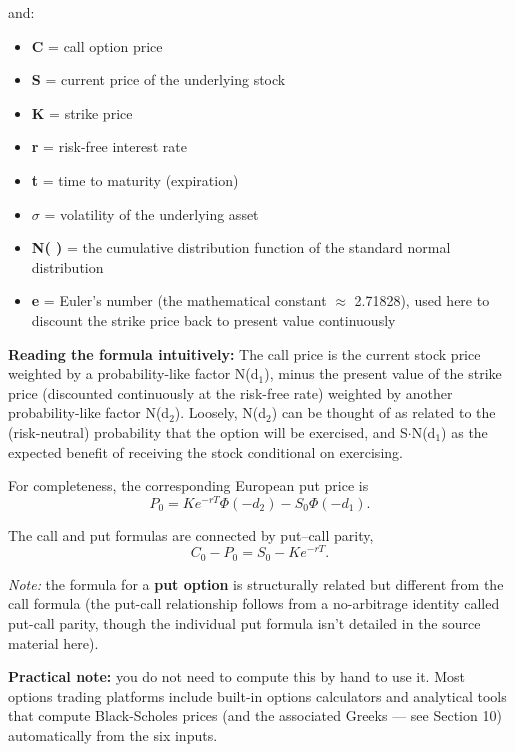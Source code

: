 \documentclass[12pt,openany]{book}
\theoremstyle{definition}
\theoremstyle{remark}
\begin{document}
and:

\begin{itemize}
\item \textbf{C} = call option price


\item \textbf{S} = current price of the underlying stock


\item \textbf{K} = strike price


\item \textbf{r} = risk-free interest rate


\item \textbf{t} = time to maturity (expiration)


\item \textbf{\(\sigma\)} = volatility of the underlying asset


\item \textbf{N( )} = the cumulative distribution function of the standard normal distribution


\item \textbf{e} = Euler's number (the mathematical constant \(\approx\) 2.71828), used here to discount the strike price back to present value continuously


\end{itemize}

\textbf{Reading the formula intuitively:} The call price is the current stock price weighted by a probability-like factor N(d\(_1\)), minus the present value of the strike price (discounted continuously at the risk-free rate) weighted by another probability-like factor N(d\(_2\)). Loosely, N(d\(_2\)) can be thought of as related to the (risk-neutral) probability that the option will be exercised, and S\(\cdot\)N(d\(_1\)) as the expected benefit of receiving the stock conditional on exercising.

For completeness, the corresponding European put price is
\[
\boxed{P_0=Ke^{-rT}\Phi(-d_2)-S_0\Phi(-d_1)}.
\]

The call and put formulas are connected by put--call parity,
\[
C_0-P_0=S_0-Ke^{-rT}.
\]

\emph{Note:} the formula for a \textbf{put option} is structurally related but different from the call formula (the put-call relationship follows from a no-arbitrage identity called put-call parity, though the individual put formula isn't detailed in the source material here).

\textbf{Practical note:} you do not need to compute this by hand to use it. Most options trading platforms include built-in options calculators and analytical tools that compute Black-Scholes prices (and the associated Greeks --- see Section 10) automatically from the six inputs.
\end{document}
